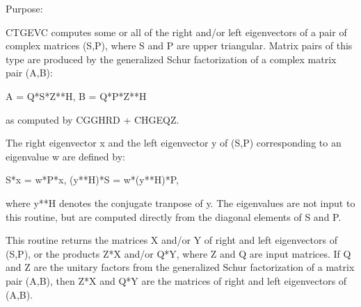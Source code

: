  \begin{DoxyParagraph}{Purpose\+: }
\begin{DoxyVerb} CTGEVC computes some or all of the right and/or left eigenvectors of
 a pair of complex matrices (S,P), where S and P are upper triangular.
 Matrix pairs of this type are produced by the generalized Schur
 factorization of a complex matrix pair (A,B):
 
    A = Q*S*Z**H,  B = Q*P*Z**H
 
 as computed by CGGHRD + CHGEQZ.
 
 The right eigenvector x and the left eigenvector y of (S,P)
 corresponding to an eigenvalue w are defined by:
 
    S*x = w*P*x,  (y**H)*S = w*(y**H)*P,
 
 where y**H denotes the conjugate tranpose of y.
 The eigenvalues are not input to this routine, but are computed
 directly from the diagonal elements of S and P.
 
 This routine returns the matrices X and/or Y of right and left
 eigenvectors of (S,P), or the products Z*X and/or Q*Y,
 where Z and Q are input matrices.
 If Q and Z are the unitary factors from the generalized Schur
 factorization of a matrix pair (A,B), then Z*X and Q*Y
 are the matrices of right and left eigenvectors of (A,B).\end{DoxyVerb}
 
\end{DoxyParagraph}

